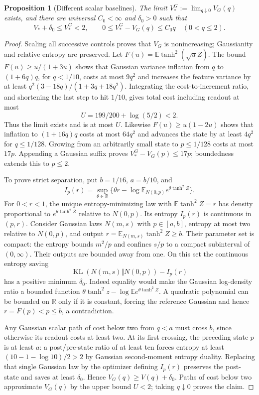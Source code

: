 \documentclass[11pt]{article}
\newtheorem{proposition}[theorem]{Proposition}
\theoremstyle{remark}\newtheorem{remark}[theorem]{Remark}
\newcommand{\R}{\mathbb R}
\newcommand{\E}{\mathbb E}
\newcommand{\KL}{\operatorname{KL}}
\begin{document}
\begin{proposition}[Different scalar baselines]\label{prop:baselines}
The limit $V_*^G:=\lim_{q\downarrow0}V_G(q)$ exists, and there are
universal $C_0<\infty$ and $\delta_0>0$ such that
\[
 V_*+\delta_0\le V_*^G<2,\qquad
 0\le V_*^G-V_G(q)\le C_0q\quad(0<q\le2).
\]
\end{proposition}
\begin{proof}
Scaling all successive controls proves that $V_G$ is nonincreasing;
Gaussianity and relative entropy are preserved. Let
$F(u)=\E\tanh^2(\sqrt uZ)$. The bound $F(u)\ge u/(1+3u)$ shows
that Gaussian variance inflation from $q$ to $(1+6q)q$, for $q<1/10$,
costs at most $9q^2$ and increases the feature variance by at least
$q^2(3-18q)/(1+3q+18q^2)$. Integrating the cost-to-increment ratio,
and shortening the last step to hit $1/10$, gives total cost including
readout at most
\[
 U=199/200+\log(5/2)<2.
\]
Thus the limit exists and is at most $U$. Likewise
$F(u)\ge u(1-2u)$ shows that inflation to $(1+16q)q$ costs at most
$64q^2$ and advances the state by at least $4q^2$ for $q\le1/128$.
Growing from an arbitrarily small state to $p\le1/128$ costs at most
$17p$. Appending a Gaussian suffix proves
$V_*^G-V_G(p)\le17p$; boundedness extends this to $p\le2$.

To prove strict separation, put $b=1/16$, $a=b/10$, and
\[
 I_p(r)=\sup_{\theta\in\R}\{\theta r-
           \log\E_{N(0,p)}e^{\theta\tanh^2 Z}\}.
\]
For $0<r<1$, the unique entropy-minimizing law with
$\E\tanh^2 Z=r$ has density proportional to
$e^{\theta\tanh^2 Z}$ relative to $N(0,p)$. Its entropy $I_p(r)$
is continuous in $(p,r)$. Consider Gaussian laws $N(m,s)$ with
$p\in[a,b]$, entropy at most two relative to $N(0,p)$, and output
$r=\E_{N(m,s)}\tanh^2 Z\ge b$. Their parameter set is compact:
the entropy bounds $m^2/p$ and confines $s/p$ to a compact subinterval
of $(0,\infty)$. Their outputs are bounded away from one.
On this set the continuous entropy saving
\[
 \KL(N(m,s)\Vert N(0,p))-I_p(r)
\]
has a positive minimum $\delta_0$. Indeed equality would make the
Gaussian log-density ratio a bounded function
$\theta\tanh^2 z-\log\E e^{\theta\tanh^2 Z}$. A quadratic
polynomial can be bounded on $\R$ only if it is constant, forcing
the reference Gaussian and hence $r=F(p)<p\le b$, a contradiction.

Any Gaussian scalar path of cost below two from $q<a$ must cross $b$,
since otherwise its readout costs at least two. At its first crossing,
the preceding state $p$ is at least $a$: a post/pre-state ratio of at
least ten forces entropy at least $(10-1-\log10)/2>2$ by Gaussian
second-moment entropy duality. Replacing that single Gaussian law by
the optimizer defining $I_p(r)$ preserves the post-state and saves at
least $\delta_0$. Hence $V_G(q)\ge V(q)+\delta_0$. Paths of cost
below two approximate $V_G(q)$ by the upper bound $U<2$; taking
$q\downarrow0$ proves the claim.
\end{proof}
\end{document}
